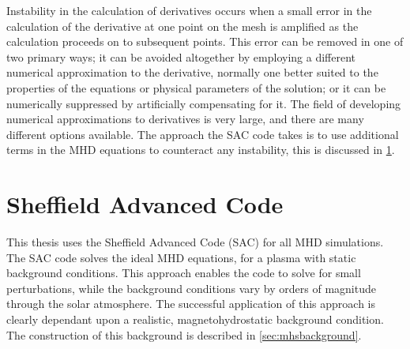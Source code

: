 Instability in the calculation of derivatives occurs when a small error in the calculation of the derivative at one point on the mesh is amplified as the calculation proceeds on to subsequent points.
This error can be removed in one of two primary ways; it can be avoided altogether by employing a different numerical approximation to the derivative, normally one better suited to the properties of the equations or physical parameters of the solution; or it can be numerically suppressed by artificially compensating for it.
The field of developing numerical approximations to derivatives is very large, and there are many different options available.
The approach the SAC code takes is to use additional terms in the MHD equations to counteract any instability, this is discussed in \cref{sec:SAC}.


\section{Sheffield Advanced Code}\label{sec:SAC}

This thesis uses the Sheffield Advanced Code (SAC) \citep{shelyag2008} for all MHD simulations.
The SAC code solves the ideal MHD equations, for a plasma with static background conditions.
This approach enables the code to solve for small perturbations, while the background conditions vary by orders of magnitude through the solar atmosphere.
The successful application of this approach is clearly dependant upon a realistic, magnetohydrostatic background condition.
The construction of this background is described in \cref{sec:mhsbackground}.

